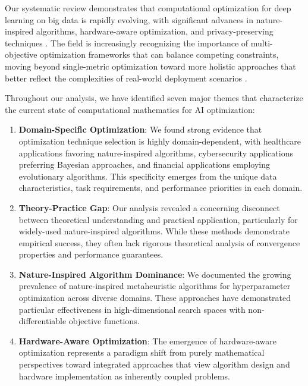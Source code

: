 \documentclass[acmsmall]{acmart}
\begin{document}
Our systematic review demonstrates that computational optimization for deep learning on big data is rapidly evolving, with significant advances in nature-inspired algorithms, hardware-aware optimization, and privacy-preserving techniques \citep{Eid20223845, Kim2022, Zhang20229876}. The field is increasingly recognizing the importance of multi-objective optimization frameworks that can balance competing constraints, moving beyond single-metric optimization toward more holistic approaches that better reflect the complexities of real-world deployment scenarios \citep{Deb2014}.

Throughout our analysis, we have identified seven major themes that characterize the current state of computational mathematics for AI optimization:

\begin{enumerate}
    \item \textbf{Domain-Specific Optimization}: We found strong evidence that optimization technique selection is highly domain-dependent, with healthcare applications favoring nature-inspired algorithms, cybersecurity applications preferring Bayesian approaches, and financial applications employing evolutionary algorithms. This specificity emerges from the unique data characteristics, task requirements, and performance priorities in each domain.

    \item \textbf{Theory-Practice Gap}: Our analysis revealed a concerning disconnect between theoretical understanding and practical application, particularly for widely-used nature-inspired algorithms. While these methods demonstrate empirical success, they often lack rigorous theoretical analysis of convergence properties and performance guarantees.

    \item \textbf{Nature-Inspired Algorithm Dominance}: We documented the growing prevalence of nature-inspired metaheuristic algorithms for hyperparameter optimization across diverse domains. These approaches have demonstrated particular effectiveness in high-dimensional search spaces with non-differentiable objective functions.

    \item \textbf{Hardware-Aware Optimization}: The emergence of hardware-aware optimization represents a paradigm shift from purely mathematical perspectives toward integrated approaches that view algorithm design and hardware implementation as inherently coupled problems.


\end{enumerate}
\end{document}
